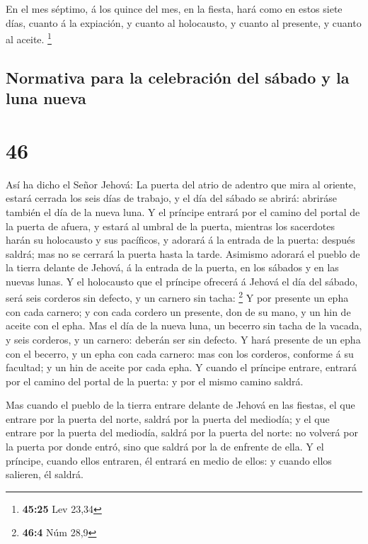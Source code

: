 En el mes séptimo, á los quince del mes, en la fiesta,
hará como en estos siete días, cuanto á la expiación, y cuanto al
holocausto, y cuanto al presente, y cuanto al aceite. \footnote{\textbf{45:25}
  Lev 23,34}

\hypertarget{normativa-para-la-celebraciuxf3n-del-suxe1bado-y-la-luna-nueva}{%
\subsection{Normativa para la celebración del sábado y la luna
nueva}\label{normativa-para-la-celebraciuxf3n-del-suxe1bado-y-la-luna-nueva}}

\hypertarget{section-45}{%
\section{46}\label{section-45}}

 Así ha dicho el Señor Jehová: La puerta del atrio de
adentro que mira al oriente, estará cerrada los seis días de trabajo, y
el día del sábado se abrirá: abriráse también el día de la nueva luna.
 Y el príncipe entrará por el camino del portal de la puerta
de afuera, y estará al umbral de la puerta, mientras los sacerdotes
harán su holocausto y sus pacíficos, y adorará á la entrada de la
puerta: después saldrá; mas no se cerrará la puerta hasta la tarde.
 Asimismo adorará el pueblo de la tierra delante de Jehová,
á la entrada de la puerta, en los sábados y en las nuevas lunas.
 Y el holocausto que el príncipe ofrecerá á Jehová el día
del sábado, será seis corderos sin defecto, y un carnero sin tacha:
\footnote{\textbf{46:4} Núm 28,9}  Y por presente un epha
con cada carnero; y con cada cordero un presente, don de su mano, y un
hin de aceite con el epha.  Mas el día de la nueva luna, un
becerro sin tacha de la vacada, y seis corderos, y un carnero: deberán
ser sin defecto.  Y hará presente de un epha con el becerro,
y un epha con cada carnero: mas con los corderos, conforme á su
facultad; y un hin de aceite por cada epha.  Y cuando el
príncipe entrare, entrará por el camino del portal de la puerta: y por
el mismo camino saldrá.

 Mas cuando el pueblo de la tierra entrare delante de Jehová
en las fiestas, el que entrare por la puerta del norte, saldrá por la
puerta del mediodía; y el que entrare por la puerta del mediodía, saldrá
por la puerta del norte: no volverá por la puerta por donde entró, sino
que saldrá por la de enfrente de ella.  Y el príncipe,
cuando ellos entraren, él entrará en medio de ellos: y cuando ellos
salieren, él saldrá.

